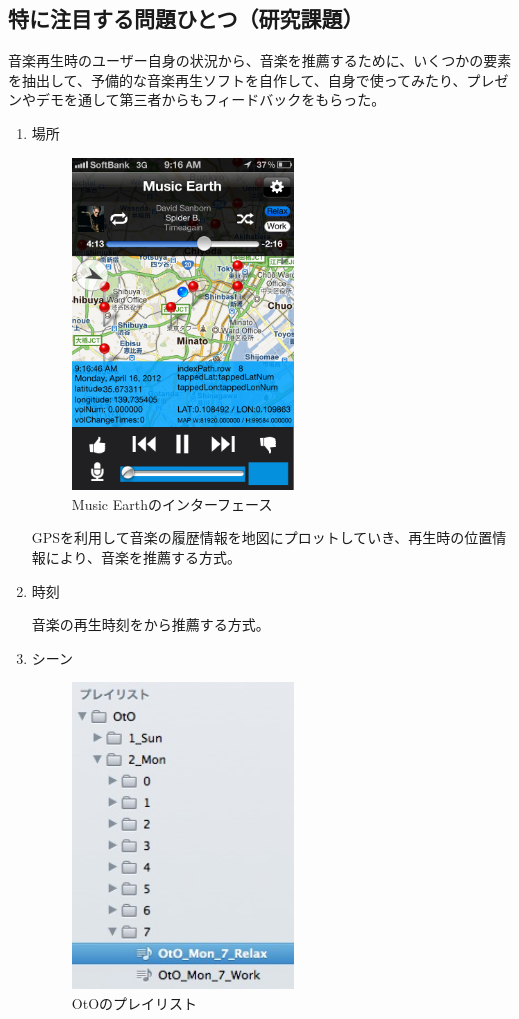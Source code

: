 \documentclass{jsarticle}
\begin{document}
\subsection{特に注目する問題ひとつ（研究課題）}
音楽再生時のユーザー自身の状況から、音楽を推薦するために、いくつかの要素を抽出して、予備的な音楽再生ソフトを自作して、自身で使ってみたり、プレゼンやデモを通して第三者からもフィードバックをもらった。
\begin{enumerate}
\item
場所



\begin{figure}[h]
\begin{center}
\includegraphics[width=5.866cm]{musicEarth.png}
\caption{Music Earthのインターフェース}
\label{musicEarth_interface}
\end{center}
\end{figure}


GPSを利用して音楽の履歴情報を地図にプロットしていき、再生時の位置情報により、音楽を推薦する方式。
\item
時刻

音楽の再生時刻をから推薦する方式。
\item
シーン

\begin{figure}[h]
\begin{center}
\includegraphics[width=5.866cm]{OtO_playList.jpg}
\caption{OtOのプレイリスト}
\label{oto_regular}
\end{center}
\end{figure}


\end{enumerate}
\end{document}
